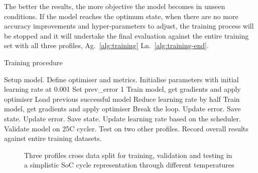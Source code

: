The better the results, the more objective the model becomes in unseen conditions.
If the model reaches the optimum state, when there are no more accuracy improvements and hyper-parameters to adjust, the training process will be stopped and it will undertake the final evaluation against the entire training set with all three profiles, Ag.~\ref{alg:training} Ln.~\ref{alg:training-end}.
\begin{algorithm}
    \caption{Training procedure}
        \begin{algorithmic}[1]
            \STATE Setup model. Define optimiser and metrics.
            \STATE Initialise parameters with initial learning rate at 0.001
            \STATE Set prev\_error 1
                \STATE Train model, get gradients and apply optimiser
                    \label{alg:training-check}
                        \STATE Load previous successful model   \label{alg:training-recovery-start}
                        \STATE Reduce learning rate by half
                        \STATE Train model, get gradients and apply optimiser
                            \STATE Break the loop. Update error. Save state. \label{alg:training-recovery-end}
                        \ENDIF
                    \ENDWHILE
                \ELSE
                    \STATE Update error. Save state. \label{alg:training-succes}
                    \STATE Update learning rate based on the scheduler.
                \ENDIF
                \STATE Validate model on 25\textdegree{}C cycler.   \label{alg:training-valid}
                \STATE Test on two other profiles. \label{alg:training-test}
            \ENDWHILE
            \STATE Record overall results against entire training datasets. \label{alg:training-end}
        \end{algorithmic}
    \label{alg:training}
\end{algorithm}
\begin{figure}[ht]
    \centering
    
    \caption{Three profiles cross data split for training, validation and testing in a simplistic SoC cycle representation through different temperatures}
    \label{fig:cross-data}
\end{figure}

